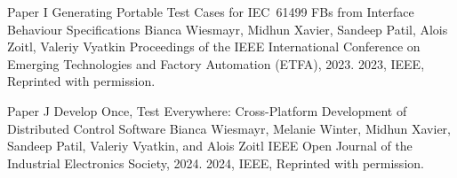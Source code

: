 \documentclass[12pt,a4paper,openright,final,twoside]{cseethesis}
\begin{document}

\makepaperaccepted
  {\paperheader}
  {\papertitle}
  {\paperauthorstring}
  {}
  {\copyrightstring}



\def\paperheader{Paper I}
\def\papertitle{Generating Portable Test Cases for IEC~61499 FBs from Interface Behaviour Specifications}
\def\paperauthorstring{Bianca Wiesmayr, Midhun Xavier, Sandeep Patil, Alois Zoitl, Valeriy Vyatkin}
\def\referencestring{Proceedings of the IEEE International Conference on Emerging Technologies and Factory Automation (ETFA), 2023.}
\def\copyrightstring{2023, IEEE, Reprinted with permission.}


\makepaperaccepted
  {\paperheader}
  {\papertitle}
  {\paperauthorstring}
  {\referencestring}
  {\copyrightstring}



\def\paperheader{Paper J}
\def\papertitle{Develop Once, Test Everywhere: Cross-Platform Development of Distributed Control Software}
\def\paperauthorstring{Bianca Wiesmayr, Melanie Winter, Midhun Xavier, Sandeep Patil, Valeriy Vyatkin, and Alois Zoitl}
\def\referencestring{IEEE Open Journal of the Industrial Electronics Society, 2024.}
\def\copyrightstring{2024, IEEE, Reprinted with permission.}


\makepaperaccepted
  {\paperheader}
  {\papertitle}
  {\paperauthorstring}
  {\referencestring}
  {\copyrightstring}


\end{document}
